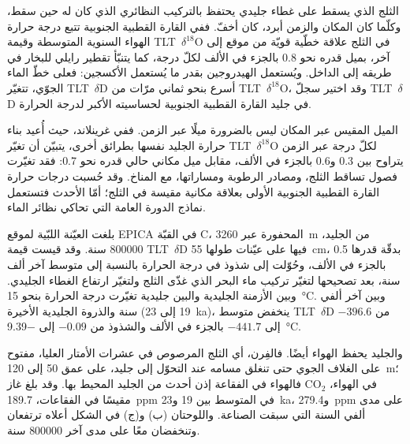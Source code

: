 الثلج الذي يسقط على غطاء جليدي يحتفظ بالتركيب النظائري الذي كان له حين سقط،
وكلّما كان المكان والزمن أبرد، كان أخفّ. ففي القارة القطبية الجنوبية تتبع درجة حرارة الهواء السنوية المتوسطة
وقيمة \mbox{\textdir TLT $\delta^{18}$O} في الثلج علاقة خطّية قويّة من موقع إلى آخر، بميل
قدره نحو \num{0.8} بالجزء في الألف لكلّ درجة، كما يتنبّأ تقطير رايلي للبخار في طريقه
إلى الداخل. ويُستعمل الهيدروجين بقدر ما يُستعمل الأكسجين: فعلى خطّ الماء الجوّي، تتغيّر \mbox{\textdir TLT $\delta$D} أسرع بنحو ثماني مرّات من \mbox{\textdir TLT $\delta^{18}$O}،
وقد اختير سجلّ \mbox{\textdir TLT $\delta$D} في جليد القارة القطبية الجنوبية لحساسيته الأكبر لدرجة الحرارة.

الميل المقيس عبر المكان ليس بالضرورة ميلًا عبر الزمن. ففي غرينلاند، حيث أُعيد بناء حرارة
الجليد نفسها بطرائق أخرى، يتبيّن أن تغيّر \mbox{\textdir TLT $\delta^{18}$O} لكلّ درجة
عبر الزمن يتراوح بين 0.3 و\num{0.6} بالجزء في الألف، مقابل ميل مكاني حالي قدره نحو
\num{0.7}: فقد تغيّرت فصول تساقط الثلج، ومصادر الرطوبة ومساراتها، مع
المناخ. وقد حُسبت درجات حرارة القارة القطبية الجنوبية الأولى بعلاقة مكانية مقيسة في
الثلج؛ أمّا الأحدث فتستعمل نماذج الدورة العامة التي تحاكي نظائر الماء.

بلغت العيّنة اللبّية لموقع EPICA في القبّة C، المحفورة عبر \qty{3260}{m} من الجليد، \num{800000} سنة. وقد
قيست قيمة \mbox{\textdir TLT $\delta$D} فيها على عيّنات طولها \qty{55}{cm}، بدقّة قدرها \num{0.5} بالجزء في الألف،
وحُوّلت إلى شذوذ في درجة الحرارة بالنسبة إلى متوسط آخر ألف سنة، بعد
تصحيحها لتغيّر تركيب ماء البحر الذي غذّى الثلج ولتغيّر
ارتفاع الغطاء الجليدي. وبين الأزمنة الجليدية والبين جليدية تغيّرت درجة الحرارة بنحو
\qty{15}{\celsius}. وبين آخر ألفي سنة والذروة الجليدية الأخيرة (\num{19} إلى
\qty{23}{ka})، ينخفض متوسط \mbox{\textdir TLT $\delta$D} من $-396.6$ إلى $-441.7$ بالجزء في الألف والشذوذ من
$-0.09$ إلى \qty{-9.39}{\celsius}.

والجليد يحفظ الهواء أيضًا. فالفِرن، أي الثلج المرصوص في عشرات الأمتار العليا، مفتوح على
الغلاف الجوي حتى تنغلق مسامه عند التحوّل إلى جليد، على عمق 50 إلى \qty{120}{m}؛ فالهواء
في الفقاعة إذن أحدث من الجليد المحيط بها. وقد بلغ غاز CO$_2$ في
الهواء، مقيسًا في الفقاعات، \qty{189.7}{ppm} في المتوسط بين \num{19} و\qty{23}{ka}، و\qty{279.4}{ppm} على مدى
ألفي السنة التي سبقت الصناعة. واللوحتان (ب) و(ج) في الشكل أعلاه ترتفعان وتنخفضان
معًا على مدى آخر \num{800000} سنة.

